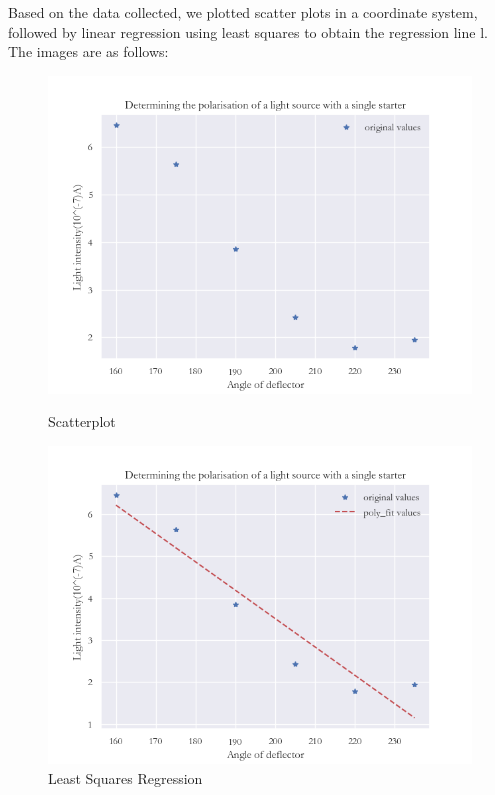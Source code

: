 \documentclass[UTF8]{article}
\begin{document}
	Based on the data collected, we plotted scatter plots in a coordinate system, followed by linear regression using least squares to obtain the regression line l. The images are as follows:
	\begin{figure}[H]
		\begin{minipage}[t]{0.5\linewidth}
			\centering
			\includegraphics[clip,scale=0.5]{figure/fig12.png}
			\caption{Scatterplot}
			\label{figure.10}
		\end{minipage}
		\begin{minipage}[t]{0.5\linewidth}
			\centering
			\includegraphics[clip,scale=0.5,trim={0 0 0 0}]{figure/Fig11.png}
			\caption{Least Squares Regression}
			\label{figure.11}
		\end{minipage}
	\end{figure}
\end{document}

